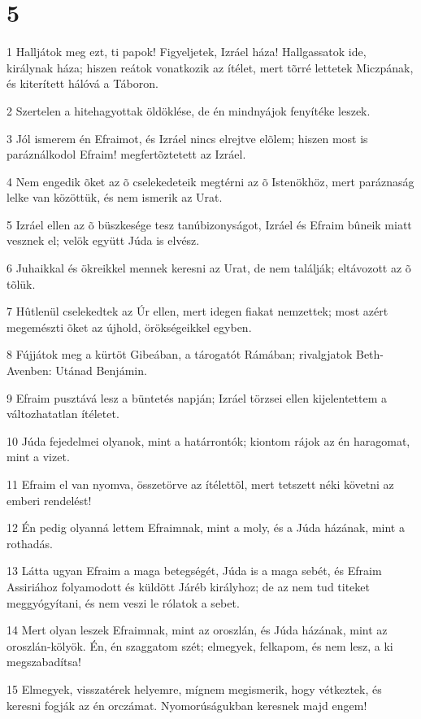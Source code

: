 \chapter{5}

\par 1 Halljátok meg ezt, ti papok! Figyeljetek, Izráel háza! Hallgassatok ide, királynak háza; hiszen reátok vonatkozik az ítélet, mert tõrré lettetek Miczpának, és kiterített hálóvá a Táboron.
\par 2 Szertelen a hitehagyottak öldöklése, de én mindnyájok fenyítéke leszek.
\par 3 Jól ismerem én Efraimot, és Izráel nincs elrejtve elõlem; hiszen most is paráználkodol Efraim! megfertõztetett az Izráel.
\par 4 Nem engedik õket az õ cselekedeteik megtérni az õ Istenökhöz, mert paráznaság lelke van közöttük, és nem ismerik az Urat.
\par 5 Izráel ellen az õ büszkesége tesz tanúbizonyságot, Izráel és Efraim bûneik miatt vesznek el; velök együtt Júda is elvész.
\par 6 Juhaikkal és ökreikkel mennek keresni az Urat, de nem találják; eltávozott az õ tõlük.
\par 7 Hûtlenül cselekedtek az Úr ellen, mert idegen fiakat nemzettek; most azért megemészti õket az újhold, örökségeikkel egyben.
\par 8 Fújjátok meg a kürtöt Gibeában, a tárogatót Rámában; rivalgjatok Beth-Avenben: Utánad Benjámin.
\par 9 Efraim pusztává lesz a büntetés napján; Izráel törzsei ellen kijelentettem a változhatatlan  ítéletet.
\par 10 Júda fejedelmei olyanok, mint a határrontók; kiontom rájok az én haragomat, mint a vizet.
\par 11 Efraim el van nyomva, összetörve az ítélettõl, mert tetszett néki követni az emberi rendelést!
\par 12 Én pedig olyanná lettem Efraimnak, mint a moly, és a Júda házának, mint a rothadás.
\par 13 Látta ugyan Efraim a maga betegségét, Júda is a maga sebét, és Efraim Assiriához folyamodott és küldött Járéb királyhoz; de az nem tud titeket meggyógyítani, és nem veszi le rólatok a sebet.
\par 14 Mert olyan leszek Efraimnak, mint az oroszlán, és Júda házának, mint az oroszlán-kölyök. Én, én szaggatom szét; elmegyek, felkapom, és nem lesz, a ki megszabadítsa!
\par 15 Elmegyek, visszatérek helyemre, mígnem megismerik, hogy vétkeztek, és keresni fogják az én orczámat. Nyomorúságukban keresnek majd engem!

